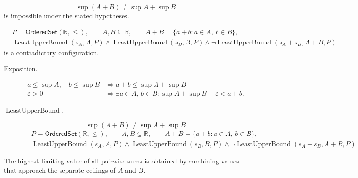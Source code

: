 \begin{remark*}
\[
\sup(A+B)\ne \sup A+\sup B
\]
is impossible under the stated hypotheses.
\end{remark*}

\begin{remark*}
\[
\begin{aligned}
&P=\mathsf{OrderedSet}(\mathbb{R},\leq),\qquad A,B\subseteq\mathbb{R},\qquad A+B=\{a+b:a\in A,\ b\in B\},\\
&\operatorname{LeastUpperBound}(s_A,A,P)\land \operatorname{LeastUpperBound}(s_B,B,P)
\land
\neg\operatorname{LeastUpperBound}(s_A+s_B,A+B,P)
\end{aligned}
\]
is a contradictory configuration.
\end{remark*}

\begin{remark*}
\begin{description}
  \item[Exposition.]
\[
\begin{aligned}
a\le \sup A,\quad b\le \sup B
&\Longrightarrow a+b\le \sup A+\sup B,\\
\varepsilon>0
&\Longrightarrow
\exists a\in A,\ b\in B:
\sup A+\sup B-\varepsilon<a+b.
\end{aligned}
\]


  \item[\(\operatorname{LeastUpperBound}.\)]
  \[
\sup(A+B)\ne \sup A+\sup B
\]
\[
\begin{aligned}
&P=\mathsf{OrderedSet}(\mathbb{R},\leq),\qquad A,B\subseteq\mathbb{R},\qquad A+B=\{a+b:a\in A,\ b\in B\},\\
&\operatorname{LeastUpperBound}(s_A,A,P)\land \operatorname{LeastUpperBound}(s_B,B,P)
\land
\neg\operatorname{LeastUpperBound}(s_A+s_B,A+B,P)
\end{aligned}
\]
\end{description}
\end{remark*}

\begin{remark*}[Interpretation]
The highest limiting value of all pairwise sums is obtained by combining values that approach the separate ceilings of $A$ and $B$.
\end{remark*}

